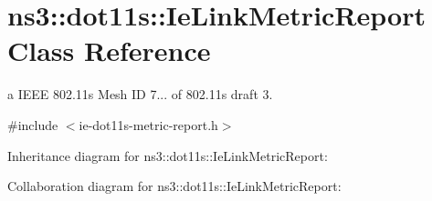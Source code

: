 \hypertarget{classns3_1_1dot11s_1_1IeLinkMetricReport}{}\section{ns3\+:\+:dot11s\+:\+:Ie\+Link\+Metric\+Report Class Reference}
\label{classns3_1_1dot11s_1_1IeLinkMetricReport}


a I\+E\+EE 802.\+11s Mesh ID 7... of 802.\+11s draft 3.  




{\ttfamily \#include $<$ie-\/dot11s-\/metric-\/report.\+h$>$}



Inheritance diagram for ns3\+:\+:dot11s\+:\+:Ie\+Link\+Metric\+Report\+:


Collaboration diagram for ns3\+:\+:dot11s\+:\+:Ie\+Link\+Metric\+Report\+:
